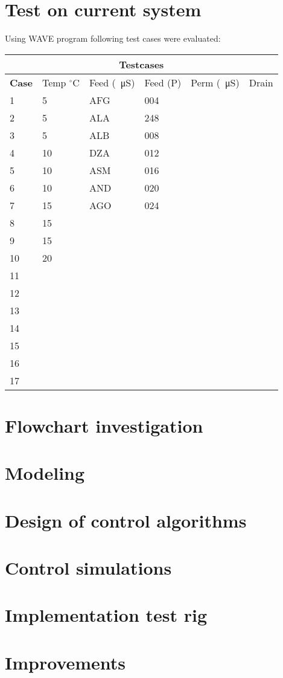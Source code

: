 
\section{Test on current system}
Using WAVE program following test cases were evaluated:

\begin{tabular}{ |p{0.6cm}||p{0.6cm}|p{0.8cm}|p{0.8cm}|p{0.8cm}|p{0.8cm}| }
 \hline
 \multicolumn{6}{|c|}{Testcases} \\
 \hline
 \textbf{Case}&Temp $^\circ$C&Feed (\SI{}{\micro\siemens})&Feed (P)&Perm (\SI{}{\micro\siemens})&Drain \\
 \hline
 1   &   5  &AFG&   004&&\\
 2 &  5  & ALA   &248&&\\
 3 &5 & ALB&  008&&\\
 4   &10 & DZA&  012&&\\
 5 &   10  & ASM&016&&\\
 6 & 10  & AND   &020&&\\
 7 & 15  & AGO&024&&\\
 8 &15&&&&\\
 9&15&&&&\\
 10&20&&&&\\
 11&&&&&\\
 12&&&&&\\
 13 &&&&&\\
 14&&&&&\\
 15 &&&&&\\
 16&&&&&\\
 17&&&&&\\
\hline
\end{tabular}



\section{Flowchart investigation}

\section{Modeling}

\section{Design of control algorithms}

\section{Control simulations}

\section{Implementation test rig}

\section{Improvements}
